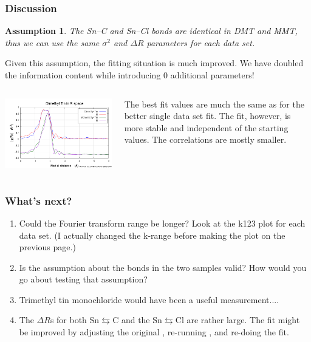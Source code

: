 \documentclass[10pt, xcolor=x11names, compress]{beamer}
\begin{document}
\newtheorem{assumption}[theorem]{Assumption}

\begin{frame}
  \frametitle{Discussion}
  \begin{assumption}
    The Sn--C and Sn--Cl bonds are identical in DMT and MMT, thus we
    can use the same $\sigma^2$ and $\Delta R$ parameters for each
    data set.
  \end{assumption}

  Given this assumption, the fitting situation is much improved.  We
  have \alert{doubled} the information content while introducing
  \alert{0} additional parameters!

  \begin{columns}
    \begin{column}{0.5\linewidth}
      \includegraphics[width=\linewidth]{images/MDS_fit.png}
    \end{column}
    \begin{column}{0.5\linewidth}
      The best fit values are much the same as for the better single
      data set fit.  The fit, however, is more stable and independent
      of the starting values.  The correlations are mostly smaller.
    \end{column}
  \end{columns}
\end{frame}

\begin{frame}
  \frametitle{What's next?}
  \begin{enumerate}
  \item Could the Fourier transform range be longer?  Look at the k123
    plot for each data set.  (I actually changed the k-range before
    making the plot on the previous page.)
  \item Is the assumption about the bonds in the two samples valid?
    How would you go about testing that assumption?
  \item Trimethyl tin monochloride would have been a useful
    measurement....
  \item The $\Delta R$s for both Sn$\leftrightarrows$C and the
    Sn$\leftrightarrows$Cl are rather large.  The fit might be
    improved by adjusting the original , re-running
    {\feff}, and re-doing the fit.
  \end{enumerate}
\end{frame}
\end{document}

